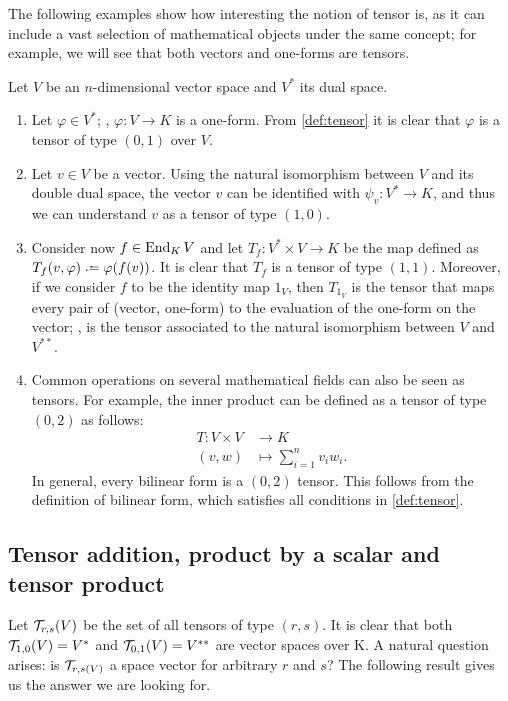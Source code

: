 \begin{example}
	The following examples show how interesting the notion of tensor is, as it can include a vast selection of mathematical objects under the same concept; for example, we will see that both vectors and one-forms are tensors.
	
	Let $V$ be an $n$-dimensional vector space and $V^*$ its dual space.
	\begin{enumerate}
		\item Let $\varphi \in V^*$; \ie,  $\varphi \colon V \to K$ is a one-form. From \autoref{def:tensor} it is clear that $\varphi$ is a tensor of type $(0,1)$ over $V$.
		\item Let $v \in V$ be a vector. Using the natural isomorphism between $V$ and its double dual space, the vector $v$ can be identified with $\psi_v \colon V^* \to K$, and thus we can understand $v$ as a tensor of type $(1,0)$.
		\item Consider now $f \in \operatorname{End}_K V$ and let $T_f \colon V^* \times V \to K$ be the map defined as $T_f(v, \varphi) \defeq \varphi(f(v))$. It is clear that $T_f$ is a tensor of type $(1,1)$. Moreover, if we consider $f$ to be the identity map $1_V$, then $T_{1_V}$ is the tensor that maps every pair of (vector, one-form) to the evaluation of the one-form on the vector; \ie, is the tensor associated to the natural isomorphism between $V$ and $V^{**}$.
		\item Common operations on several mathematical fields can also be seen as tensors. For example, the inner product can be defined as a tensor of type $(0,2)$ as follows:
		\begin{align*}
			T \colon V \times V &\to K\\
			(v,w) &\mapsto \sum_{i=1}^n v_i w_i.
		\end{align*}
		In general, every bilinear form is a $(0,2)$ tensor. This follows from the definition of bilinear form, which satisfies all conditions in \autoref{def:tensor}.
	\end{enumerate}
\end{example}

\subsection{Tensor addition, product by a scalar and tensor product}
Let ${\mathcal T}_{r,s}(V)$ be the set of all tensors of type $(r,s)$. It is clear that both ${\mathcal T}_{1,0}(V) = V^*$ and ${\mathcal T}_{0,1}(V) = V^{**}$ are vector spaces over K. A natural question arises: is ${\mathcal T}_{r,s(V)}$ a space vector for arbitrary $r$ and $s$? The following result gives us the answer we are looking for.

